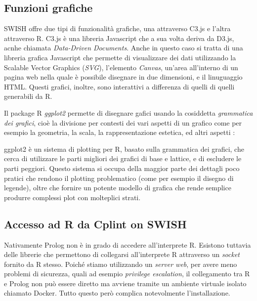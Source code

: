 \documentclass[10pt,titlepage,twoside,a4paper]{report}
\begin{document}
        \subsection{Funzioni grafiche}
SWISH offre due tipi di funzionalità grafiche, una attraverso C3.js e l'altra
attraverso R. C3.js è una libreria Javascript che a sua volta deriva da
D3.js, acnhe chiamata \emph{Data-Driven Documents}. Anche in questo caso si 
tratta di una libreria grafica Javascript che permette di visualizzare
dei dati utilizzando la Scalable Vector Graphics (\emph{SVG}), l'elemento 
\emph{Canvas}, un'area all'interno di un pagina web nella quale è possibile 
disegnare in due dimensioni\cite{canvasHtml}, e il linuguaggio 
HTML\cite{d3js}. Questi grafici, inoltre, sono interattivi a differenza di 
quelli di quelli generabili da R.

Il package R \emph{ggplot2} 
permette di disegnare gafici usando la 
cosiddetta \emph{grammatica dei grafici}, cioè la divisione per contesti dei 
vari aspetti di un grafico come per esempio la geometria, la scala, la 
rappresentazione estetica, ed altri aspetti \cite{ggplot2OriginalDefinition}:

\begin{displayquote}
ggplot2 è un sistema di plotting per R, basato sulla grammatica dei grafici,
che cerca di utilizzare le parti migliori dei grafici di base e lattice, e di 
escludere le parti peggiori. Questo sistema si occupa della maggior parte dei
dettagli poco pratici che rendono il plotting problematico (come per esempio 
il disegno di legende), oltre che fornire un potente modello di grafica che
rende semplice produrre complessi plot con molteplici strati.
\end{displayquote}


        \subsection{Accesso ad R da Cplint on SWISH}
Nativamente Prolog non è in grado di accedere all'interprete R. Esistono 
tuttavia delle librerie che permettono di collegarsi all'interprete R
attraverso un \emph{socket} fornito da R stesso. Poiché stiamo utilizzando  
un \emph{server web}, per avere meno problemi di sicurezza, quali ad esempio 
\emph{privilege escalation}, il collegamento tra R e Prolog non può essere 
diretto ma avviene tramite un ambiente virtuale isolato chiamato Docker. 
Tutto questo però complica notevolmente l'installazione.
\end{document}
